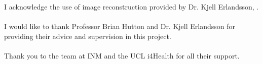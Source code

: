 \begin{impactstatement}

\end{impactstatement}


\begin{acknowledgements}
I acknowledge the use of image reconstruction provided by Dr. Kjell Erlandsson, \cite{8069508}.
\paragraph{}
I would like to thank Professor Brian Hutton and Dr. Kjell Erlandsson for providing their advice and supervision in this project. 
\paragraph{}
Thank you to the team at INM and the UCL i4Health for all their support. 
\end{acknowledgements}

\setcounter{tocdepth}{2} 

\tableofcontents
\listoffigures
 \listoftables
%
\printglossaries
